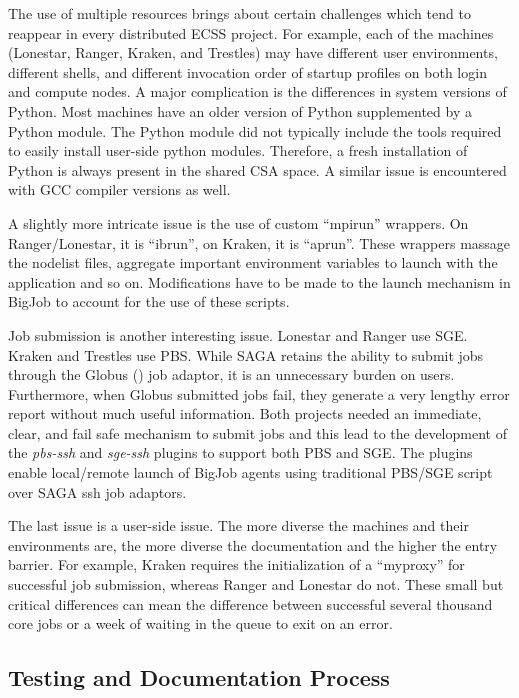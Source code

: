 \documentclass{sig-alternate}
\begin{document}
The use of multiple resources brings about certain challenges which
tend to reappear in every distributed ECSS project. For example, each
of the machines (Lonestar, Ranger, Kraken, and Trestles) may have
different user environments, different shells, and different
invocation order of startup profiles on both login and compute
nodes. A major complication is the differences in system versions of
Python. Most machines have an older version of Python supplemented by
a Python module. The Python module did not typically include the tools
required to easily install user-side python modules. Therefore, a
fresh installation of Python is always present in the shared CSA
space. A similar issue is encountered with GCC compiler versions as
well.

A slightly more intricate issue is the use of custom ``mpirun'' wrappers. On
Ranger/Lonestar, it is ``ibrun'', on Kraken, it is ``aprun''. These wrappers
massage the nodelist files, aggregate important environment variables to launch
with the application and so on. Modifications have to be made to the launch
mechanism in BigJob to account for the use of these scripts.

Job submission is another interesting issue. Lonestar and Ranger use SGE. 
Kraken and Trestles use PBS. While SAGA retains the ability to submit jobs
through the Globus (\cite{Globus}) job adaptor, it is an unnecessary burden on
users. Furthermore, when Globus submitted jobs fail, they generate a very
lengthy error report without much useful information. Both projects needed an
immediate, clear, and fail safe mechanism to submit jobs and this lead to the
development of the \textit{pbs-ssh} and \textit{sge-ssh} plugins to support both
PBS and SGE. The plugins enable local/remote launch of BigJob agents using
traditional PBS/SGE script over SAGA ssh job adaptors.

The last issue is a user-side issue. The more diverse the machines and their
environments are, the more diverse the documentation and the higher the entry
barrier. For example, Kraken requires the initialization of a ``myproxy'' for
successful job submission, whereas Ranger and Lonestar do not. These small  but
critical differences can mean the difference between successful several thousand
core jobs or a week of waiting in the queue to exit on an error.


\subsection{Testing and Documentation Process}
\end{document}
